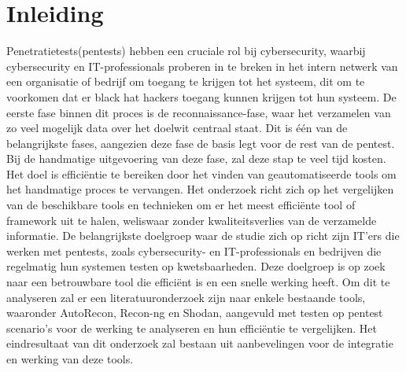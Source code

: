 


% 




\section{Inleiding}%
\label{sec:inleiding}

Penetratietests(pentests) hebben een cruciale rol bij cybersecurity, waarbij cybersecurity en IT-professionals proberen in te breken in het intern netwerk 
van een organisatie of bedrijf om toegang te krijgen tot het systeem, dit om te voorkomen dat er black hat hackers toegang kunnen krijgen tot hun systeem. 
De eerste fase binnen dit proces is de reconnaissance-fase, waar het verzamelen van zo veel mogelijk data over het doelwit centraal staat. Dit is één van de belangrijkste fases, 
aangezien deze fase de basis legt voor de rest van de pentest. Bij de handmatige uitgevoering van deze fase, zal deze stap te veel tijd kosten. 
Het doel is efficiëntie te bereiken door het vinden van geautomatiseerde tools om het handmatige proces te vervangen.
Het onderzoek richt zich op het vergelijken van de beschikbare tools en technieken om er het meest efficiënte tool of framework uit te halen, weliswaar zonder kwaliteitsverlies van de verzamelde informatie.
De belangrijkste doelgroep waar de studie zich op richt zijn IT’ers die werken met pentests, zoals cybersecurity- en IT-professionals en bedrijven die regelmatig hun systemen testen op kwetsbaarheden. 
Deze doelgroep is op zoek naar een betrouwbare tool die efficiënt is en een snelle werking heeft. 
Om dit te analyseren zal er een literatuuronderzoek zijn naar enkele bestaande tools, waaronder 
AutoRecon, Recon-ng en Shodan, aangevuld met testen op pentest scenario’s voor de werking te analyseren en hun efficiëntie te vergelijken. 
Het eindresultaat van dit onderzoek zal bestaan uit aanbevelingen voor de integratie en werking van deze tools.


